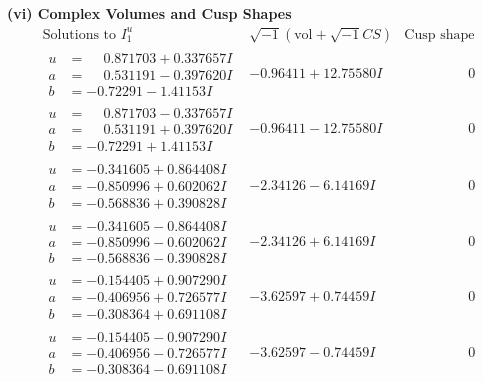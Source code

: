 \documentclass[1p]{elsarticle_modified}
\theoremstyle{definition}
\newcommand{\I}{\sqrt{-1}}
\begin{document}
\newpage\flushleft \textbf{(vi) Complex Volumes and Cusp Shapes}
$$\begin{array}{c|c|c}  
\text{Solutions to }I^u_{1}& \I (\text{vol} + \sqrt{-1}CS) & \text{Cusp shape}\\
 \hline 
\begin{aligned}
u &= \phantom{-}0.871703 + 0.337657 I \\
a &= \phantom{-}0.531191 - 0.397620 I \\
b &= -0.72291 - 1.41153 I\end{aligned}
 & -0.96411 + 12.75580 I & \phantom{-0.000000 } 0 \\ \hline\begin{aligned}
u &= \phantom{-}0.871703 - 0.337657 I \\
a &= \phantom{-}0.531191 + 0.397620 I \\
b &= -0.72291 + 1.41153 I\end{aligned}
 & -0.96411 - 12.75580 I & \phantom{-0.000000 } 0 \\ \hline\begin{aligned}
u &= -0.341605 + 0.864408 I \\
a &= -0.850996 + 0.602062 I \\
b &= -0.568836 + 0.390828 I\end{aligned}
 & -2.34126 - 6.14169 I & \phantom{-0.000000 } 0 \\ \hline\begin{aligned}
u &= -0.341605 - 0.864408 I \\
a &= -0.850996 - 0.602062 I \\
b &= -0.568836 - 0.390828 I\end{aligned}
 & -2.34126 + 6.14169 I & \phantom{-0.000000 } 0 \\ \hline\begin{aligned}
u &= -0.154405 + 0.907290 I \\
a &= -0.406956 + 0.726577 I \\
b &= -0.308364 + 0.691108 I\end{aligned}
 & -3.62597 + 0.74459 I & \phantom{-0.000000 } 0 \\ \hline\begin{aligned}
u &= -0.154405 - 0.907290 I \\
a &= -0.406956 - 0.726577 I \\
b &= -0.308364 - 0.691108 I\end{aligned}
 & -3.62597 - 0.74459 I & \phantom{-0.000000 } 0 \\ \hline\begin{aligned}

\end{aligned}
\end{array}$$
\end{document}
